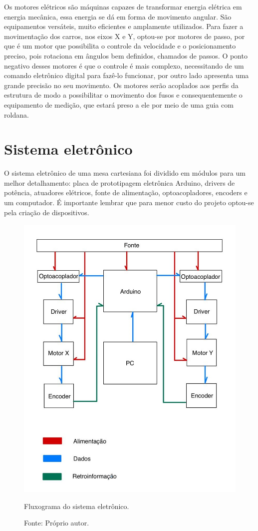 Os motores elétricos são máquinas capazes de transformar energia elétrica em energia mecânica, 
essa energia se dá em forma de movimento angular. São equipamentos versáteis, muito eficientes 
e amplamente utilizados. Para fazer a movimentação dos carros, nos eixos X e Y, optou-se por 
motores de passo, por que é um motor que possibilita o controle da velocidade e o posicionamento 
preciso, pois rotaciona em ângulos bem definidos, chamados de passos. O ponto negativo desses 
motores é que o controle é mais complexo, necessitando de um comando eletrônico digital para 
fazê-lo funcionar, por outro lado apresenta uma grande precisão no seu movimento. Os motores 
serão acoplados aos perfis da estrutura de modo a possibilitar o movimento dos fusos e consequentemente 
o equipamento de medição, que estará preso a ele por meio de uma guia com roldana. 

\section{Sistema eletrônico}\label{sec:metsisele}

O sistema eletrônico de uma mesa cartesiana foi dividido em módulos para um melhor detalhamento: 
placa de prototipagem eletrônica Arduino, drivers de potência, atuadores elétricos, fonte de alimentação, 
optoacopladores, encoders e um computador. É importante lembrar que para menor custo do projeto optou-se 
pela criação de dispositivos.

\begin{figure}[H]
\centering
\includegraphics[width = 1\linewidth]{figuras/fluxogramaeletronico}
\caption{Fluxograma do sistema eletrônico.}
\caption*{Fonte: Próprio autor.}
\label{fig:fluxogramaeletronico}
\end{figure}
    
